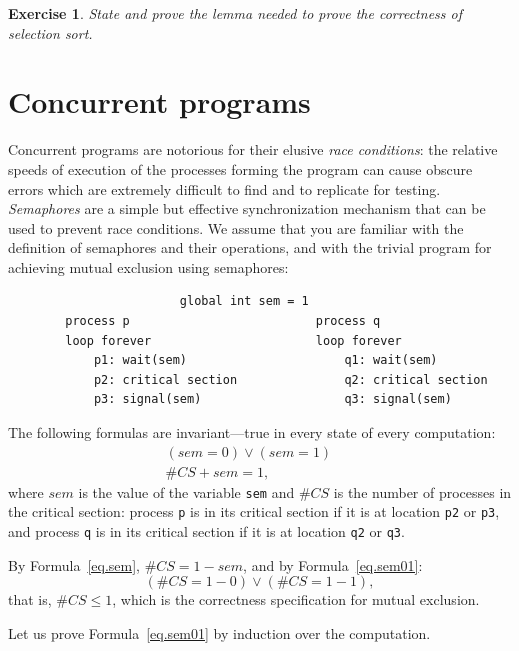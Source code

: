\documentclass[11pt,a4paper]{report}
\newtheorem{exercise}{Exercise}
\begin{document}
\begin{exercise}
State and prove the lemma needed to prove the correctness of selection sort.
\end{exercise}


\section{Concurrent programs}

Concurrent programs are notorious for their elusive \emph{race conditions}: the relative speeds of execution of the processes forming the program can cause obscure errors which are extremely difficult to find and to replicate for testing. \emph{Semaphores} are a simple but effective synchronization mechanism that can be used to prevent race conditions. We assume that you are familiar with the definition of semaphores and their operations, and with the trivial program for achieving mutual exclusion using semaphores:

\begin{verbatim}
                        global int sem = 1
        process p                          process q
        loop forever                       loop forever
            p1: wait(sem)                      q1: wait(sem)
            p2: critical section               q2: critical section
            p3: signal(sem)                    q3: signal(sem)
\end{verbatim}

The following formulas are invariant---true in every state of every computation:
\begin{eqnarray}
(\mathit{sem} = 0) \vee (\mathit{sem} = 1)&&\label{eq.sem01}\\
\#\mathit{CS} + \mathit{sem} = 1,&&\label{eq.sem}
\end{eqnarray}
where $\mathit{sem}$ is the value of the variable \texttt{sem} and $\#\mathit{CS}$ is the number of processes in the critical section: process \texttt{p} is in its critical section if it is at location \texttt{p2} or \texttt{p3}, and process \texttt{q} is in its critical section if it is at location \texttt{q2} or \texttt{q3}.

By Formula~\ref{eq.sem},  $\#\mathit{CS}= 1-\mathit{sem}$, and by Formula~\ref{eq.sem01}:
\[(\#\mathit{CS}= 1-0) \vee (\#\mathit{CS}= 1-1),\]
that is, $\#\mathit{CS} \leq 1$, which is the correctness specification for mutual exclusion.

Let us prove Formula~\ref{eq.sem01} by induction over the computation.
\end{document}
